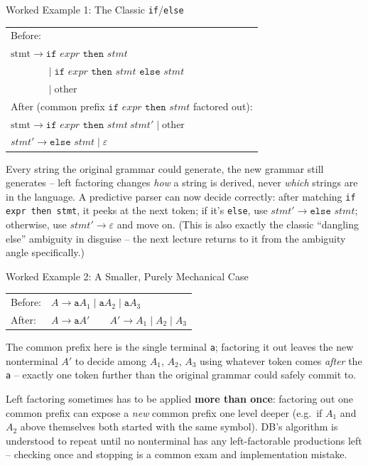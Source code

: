 \documentclass[full-course-notes.tex]{subfiles}
\begin{document}
\begin{examplebox}{Worked Example 1: The Classic \texttt{if}/\texttt{else}}
\begin{center}
\ttfamily
\begin{tabular}{@{}l@{}}
Before: \\
$\text{stmt} \to \texttt{if } expr \texttt{ then } stmt$ \\
$\phantom{\text{stmt} \to} \mid \texttt{if } expr \texttt{ then } stmt \texttt{ else } stmt$ \\
$\phantom{\text{stmt} \to} \mid \text{other}$ \\[4pt]
After (common prefix $\texttt{if } expr \texttt{ then } stmt$ factored out): \\
$\text{stmt} \to \texttt{if } expr \texttt{ then } stmt\ stmt' \mid \text{other}$ \\
$stmt' \to \texttt{else } stmt \mid \varepsilon$
\end{tabular}
\end{center}
Every string the original grammar could generate, the new grammar still generates -- left
factoring changes \emph{how} a string is derived, never \emph{which} strings are in the
language. A predictive parser can now decide correctly: after matching
\texttt{if expr then stmt}, it peeks at the next token; if it's \texttt{else}, use
$stmt' \to \texttt{else } stmt$; otherwise, use $stmt' \to \varepsilon$ and move on. (This is
also exactly the classic ``dangling else'' ambiguity in disguise -- the next lecture returns to
it from the ambiguity angle specifically.)
\end{examplebox}

\begin{examplebox}{Worked Example 2: A Smaller, Purely Mechanical Case}
\begin{center}
\ttfamily
\begin{tabular}{@{}ll@{}}
Before: & $A \to \texttt{a}A_1 \mid \texttt{a}A_2 \mid \texttt{a}A_3$ \\
After: & $A \to \texttt{a}A' \qquad A' \to A_1 \mid A_2 \mid A_3$
\end{tabular}
\end{center}
The common prefix here is the single terminal \texttt{a}; factoring it out leaves the new
nonterminal $A'$ to decide among $A_1$, $A_2$, $A_3$ using whatever token comes \emph{after}
the \texttt{a} -- exactly one token further than the original grammar could safely commit to.
\end{examplebox}

\begin{examfocus}
Left factoring sometimes has to be applied \textbf{more than once}: factoring out one common
prefix can expose a \emph{new} common prefix one level deeper (e.g.\ if $A_1$ and $A_2$ above
themselves both started with the same symbol). DB's algorithm is understood to repeat until no
nonterminal has any left-factorable productions left -- checking once and stopping is a common
exam and implementation mistake.
\end{examfocus}
\end{document}
